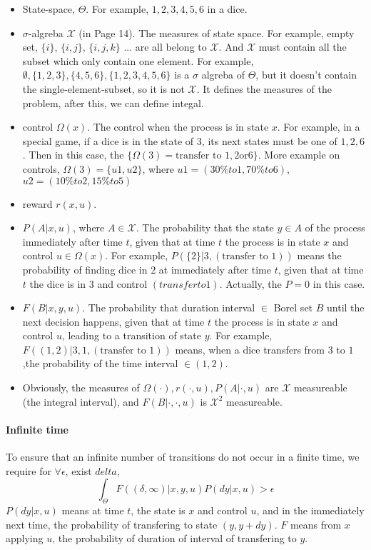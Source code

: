 \begin{itemize}
\item State-space, $\Theta$. For example, $1,2,3,4,5,6$ in a dice.
\item $\sigma$-algreba $\mathcal{X}$ (in Page 14). The measures of state space. For example, empty set, $\{i\}$, $\{i,j\}$, $\{i,j,k\}$ ... 
are all belong to $\mathcal{X}$. And $\mathcal{X}$ must contain all the subset which only contain one element.
For example, $\emptyset, \{1,2,3\},\{4,5,6\},\{1,2,3,4,5,6\}$ is a $\sigma$ algreba of $\Theta$, but it doesn't
contain the single-element-subset, so it is not $\mathcal{X}$. It defines the measures of the problem, after this,
we can define integal.
\item control $\Omega(x)$. 
The control when the process is in state $x$. For example, in a special game, if 
a dice is in the state of $3$, its next states must be one of $1,2,6$. Then in this case, the 
		$\{\Omega(3) = \textrm{transfer to } 1,2 \textrm{or} 6\}$.
	More example on controls, $\Omega(3) = \{ u1,u2 \}$, where $u1 = (30\% to 1, 70\% to 6)$,
	$u2 = (10\% to 2, 15\% to 5)$
\item reward $r(x,u)$.
\item $P(A|x,u)$, where $A \in \mathcal{X}$. The probability that the state $y \in A$ of the process immediately after
	time $t$, given that at time $t$ the process is in state $x$ and control $u \in \Omega(x)$. For example, 
	$P(\{2\}|3,(\textrm{transfer to 1}))$ means the probability of finding dice in $2$ at immediately after time $t$, given that at time
	$t$ the dice is in $3$ and control $(transfer to 1)$. Actually, the $P = 0$ in this case.
\item $F(B|x,y,u)$. The probability that duration interval $\in$ Borel set $B$ until the next decision happens, given that at time $t$
	the process is in state $x$ and control $u$, leading to a transition of state $y$. For example, $F\left(\left(1,2\right)|3,1,\left(\textrm{transfer to 1}\right)\right)$
	means, when a dice transfers from $3$ to $1$,the probability of the time interval $\in (1,2)$.
\item Obviously, the measures of $\Omega(\cdot), r(\cdot,u), P(A|\cdot,u)$ are $\mathcal{X}$ measureable (the integral interval),
	and $F(B|\cdot,\cdot,u)$ is $\mathcal{X}^2$ measureable.
\end{itemize}

\paragraph{Infinite time}
To ensure that an infinite number of transitions do not occur in a finite time, we require for $\forall \epsilon$, exist $delta$,
\[
	\int_{\Theta}F\left( \left(\delta,\infty \right) | x,y,u \right) P\left( dy | x,u \right) > \epsilon
\]
$P(dy|x,u)$ means at time $t$, the state is $x$ and control $u$, and in the immediately next time, the probability of transfering to
state $(y, y+dy)$. $F$ means from $x$ applying $u$, the probability of duration of interval of transfering to $y$.

